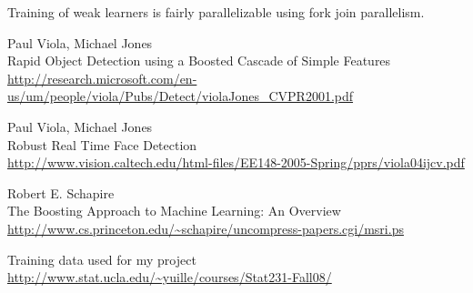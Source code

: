\documentclass[11pt,twocolumn]{article}
\begin{document}
Training of weak learners is fairly parallelizable using fork join
parallelism. 

\begin{thebibliography}{9}

  Paul Viola, Michael Jones\\
  Rapid Object Detection using a Boosted Cascade of Simple Features\\
  \url{http://research.microsoft.com/en-us/um/people/viola/Pubs/Detect/violaJones_CVPR2001.pdf}

  Paul Viola, Michael Jones\\
  Robust Real Time Face Detection\\
  \url{http://www.vision.caltech.edu/html-files/EE148-2005-Spring/pprs/viola04ijcv.pdf}

  Robert E. Schapire\\
  The Boosting Approach to Machine Learning: An Overview\\
  \url{http://www.cs.princeton.edu/~schapire/uncompress-papers.cgi/msri.ps}

  Training data used for my project\\
  \url{http://www.stat.ucla.edu/~yuille/courses/Stat231-Fall08/}

\end{thebibliography}
\end{document}
